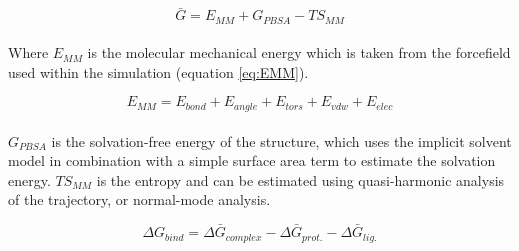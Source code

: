     \begin{equation}\label{eq:G}
        \bar{G} = E_{MM} + G_{PBSA} -TS_{MM}
    \end{equation}

    \paragraph{}
        Where $E_{MM}$ is the molecular mechanical energy which is taken from the forcefield used within the simulation (equation \ref{eq:EMM}).

    \begin{equation}\label{eq:EMM}
        E_{MM} = E_{bond} + E_{angle} + E_{tors} + E_{vdw} + E_{elec}
    \end{equation}

    \paragraph{}
        $G_{PBSA}$ is the solvation-free energy of the structure, which uses the implicit solvent model in combination with a simple surface area term to estimate the solvation energy. $TS_{MM}$ is the entropy and can be estimated using quasi-harmonic analysis of the trajectory, or normal-mode analysis.
        
    \begin{equation}\label{eq:GBSA}
        \Delta G_{bind} = \Delta \bar{G}_{complex} - \Delta \bar{G}_{prot.} - \Delta \bar{G}_{lig.}
    \end{equation}